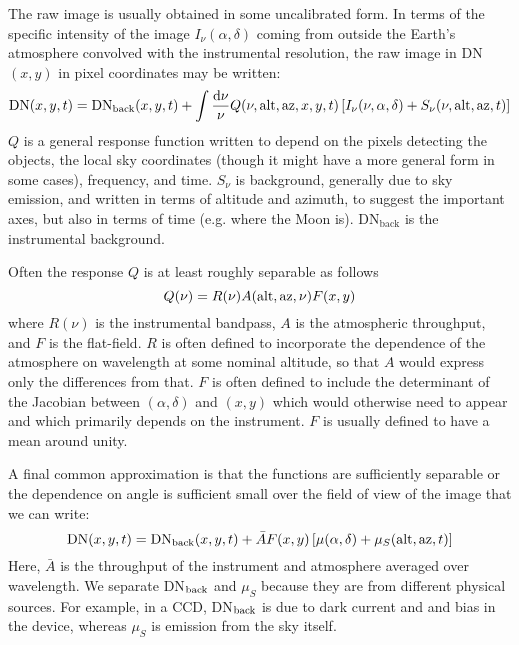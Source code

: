 The raw image is usually obtained in some uncalibrated form. In terms
of the specific intensity of the image $I_\nu(\alpha, \delta)$ coming
from outside the Earth's atmosphere convolved with the instrumental
resolution, the raw image in DN$(x,y)$ in pixel coordinates may be
written:
\begin{equation}
\mathrm{DN}(x, y, t) = \mathrm{DN}_{\mathrm{back}}(x, y, t) + 
\int \frac{{\rm d}\nu}{\nu} Q(\nu, {\rm alt}, {\rm az}, x, y, t)
\left[I_\nu(\nu, \alpha, \delta) + S_{\nu}(\nu, {\rm alt}, {\rm az},
t)\right]
\end{equation}
$Q$ is a general response function written to depend on the pixels
detecting the objects, the local sky coordinates (though it might have
a more general form in some cases), frequency, and time. $S_{\nu}$ is
background, generally due to sky emission, and written in terms of
altitude and azimuth, to suggest the important axes, but also in terms
of time (e.g. where the Moon is). DN$_{\mathrm{back}}$ is the
instrumental background.

Often the response $Q$ is at least roughly separable as follows
\begin{equation}
Q(\nu) = R(\nu) A({\rm alt}, {\rm az}, \nu) F(x, y)
\end{equation}
where $R(\nu)$ is the instrumental bandpass, $A$ is the atmospheric
throughput, and $F$ is the flat-field. $R$ is often defined to
incorporate the dependence of the atmosphere on wavelength at some
nominal altitude, so that $A$ would express only the differences from
that. $F$ is often defined to include the determinant of the Jacobian
between $(\alpha, \delta)$ and $(x, y)$ which would otherwise need to
appear and which primarily depends on the instrument. $F$ is usually
defined to have a mean around unity.

A final common approximation is that the functions are sufficiently
separable or the dependence on angle is sufficient small over the
field of view of the image that we can write:
\begin{equation}
\mathrm{DN}(x, y, t) = \mathrm{DN}_{\mathrm{back}}(x, y, t) + 
\bar{A} F(x, y) \left[\mu(\alpha, \delta) + \mu_S({\rm alt}, {\rm az},
t)\right]
\end{equation}
Here, $\bar{A}$ is the throughput of the instrument and atmosphere
averaged over wavelength.  We separate DN$_{\rm back}$ and $\mu_S$
because they are from different physical sources. For example, in a
CCD, DN$_{\rm back}$ is due to dark current and and bias in the
device, whereas $\mu_S$ is emission from the sky itself.

